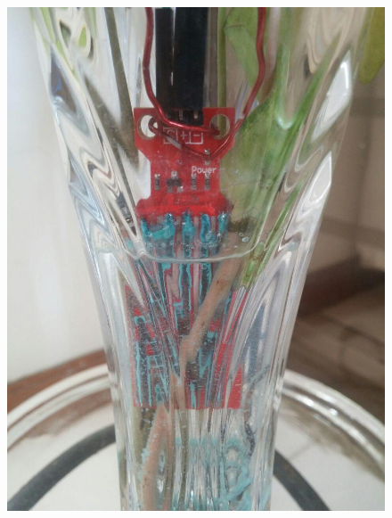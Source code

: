 \begin{itemize}
\begin{figure}[htb]
\centering
\includegraphics[scale=0.11]{./Figuras/sensor_agua.jpg}

\end{figure}
\end{itemize}
